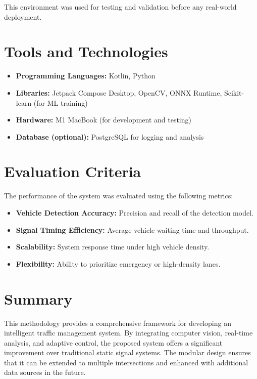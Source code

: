 This environment was used for testing and validation before any real-world deployment.

\section{Tools and Technologies}

\begin{itemize}
    \item \textbf{Programming Languages:} Kotlin, Python
    \item \textbf{Libraries:} Jetpack Compose Desktop, OpenCV, ONNX Runtime, Scikit-learn (for ML training)
    \item \textbf{Hardware:} M1 MacBook (for development and testing)
    \item \textbf{Database (optional):} PostgreSQL for logging and analysis
\end{itemize}

\section{Evaluation Criteria}

The performance of the system was evaluated using the following metrics:

\begin{itemize}
    \item \textbf{Vehicle Detection Accuracy:} Precision and recall of the detection model.
    \item \textbf{Signal Timing Efficiency:} Average vehicle waiting time and throughput.
    \item \textbf{Scalability:} System response time under high vehicle density.
    \item \textbf{Flexibility:} Ability to prioritize emergency or high-density lanes.
\end{itemize}

\section{Summary}

This methodology provides a comprehensive framework for developing an intelligent traffic management system. By integrating computer vision, real-time analysis, and adaptive control, the proposed system offers a significant improvement over traditional static signal systems. The modular design ensures that it can be extended to multiple intersections and enhanced with additional data sources in the future.